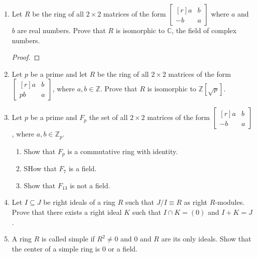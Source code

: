 \documentclass{article}
\theoremstyle{definition}
\newcommand{\Z}{\mathbb{Z}}
\newcommand{\C}{\mathbb{C}}
\newcommand{\mat}[1]{\begin{bmatrix*}[r] #1 \end{bmatrix*}}
\newcommand{\x}{\times}
\newcommand{\inv}[1]{{#1}^{-1}}
\begin{document}
\begin{enumerate}
            \begin{proof}
                $\inv{\mat{a & b \\ -3b & a}}=\frac{1}{a^2+3b^2}\mat{a&b\\-3b&a}$ and $\mat{a&b\\-3b&a}\mat{x&y\\-3y&x}=\mat{ax-3by&ay+bx\\-3(ay+bx)&ax-3by}$. Addition follows trivially.
            \end{proof}

            \item Let $R$ be the ring of all $2\times 2$ matrices of the form $\mat{a &b\\-b&a}$ where $a$ and $b$ are real numbers. Prove that $R$ is isomorphic to $\C$, the field of complex numbers.
            
            \begin{proof}
                
            \end{proof}

            \item Let $p$ be a prime and let $R$ be the ring of all $2\times 2$ matrices of the form $\mat{a&b\\pb&a}$, where $a,b\in \Z$. Prove that $R$ is isomorphic to $\Z[\sqrt{p}]$.
            
            \item Let $p$ be a prime and $F_p$ the set of all $2\x 2$ matrices of the form $\mat{a&b\\-b&a}$, where $a,b\in \Z_p$.
            
            \begin{enumerate}
                \item Show that $F_p$ is a commutative ring with identity.
                \item SHow that $F_7$ is a field.
                \item Show that $F_{13}$ is not a field.
            \end{enumerate}

            \item Let $I\subseteq J$ be right ideals of a ring $R$ such that $J/I \equiv R$ as right $R$-modules. Prove that there exists a right ideal $K$ such that $I\cap K=(0)$ and $I+K=J$.
            
            \item A ring $R$ is called simple if $R^2 \neq 0$ and $0$ and $R$ are its only ideals. Show that the center of a simple ring is $0$ or a field. 
            

\end{enumerate}
\end{document}
